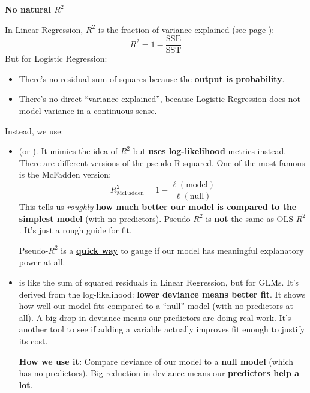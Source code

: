 \highspace
\begin{flushleft}
    \textcolor{Red2}{ \textbf{No natural $R^2$}}
\end{flushleft}
In Linear Regression, $R^2$ is the fraction of variance explained (see page \pageref{eq: coefficient of determination}):
\begin{equation*}
    R^2 = 1 - \frac{\text{SSE}}{\text{SST}}
\end{equation*}
But for Logistic Regression:
\begin{itemize}[label=\textcolor{Red2}{}]
    \item There's no residual sum of squares because the \textbf{output is probability}.
    \item There's no direct ``variance explained'', because Logistic Regression does not model variance in a continuous sense.
\end{itemize}
Instead, we use:
\begin{itemize}
    \item {} (or ). It mimics the idea of $R^{2}$ but \textbf{uses log-likelihood} metrics instead. There are different versions of the pseudo R-squared. One of the most famous is the McFadden version:
    \begin{equation}
        R^2_{\text{McFadden}} = 1 - \dfrac{\ell(\text{model})}{\ell(\text{null})}
    \end{equation}
    This tells us \emph{roughly} \textbf{how much better our model is compared to the simplest model} (with no predictors). Pseudo-$R^2$ is \textbf{not} the same as OLS $R^2$. It's just a rough guide for fit.

    Pseudo-$R^2$ is a \textbf{\underline{quick way}} to gauge if our model has meaningful explanatory power at all.


    \item {} is like the sum of squared residuals in Linear Regression, but for GLMs. It's derived from the log-likelihood: \textbf{lower deviance means better fit}. It shows how well our model fits compared to a ``null'' model (with no predictors at all). A big drop in deviance means our predictors are doing real work. It's another tool to see if adding a variable actually improves fit enough to justify its cost.

    \textcolor{Green3}{ \textbf{How we use it:}} Compare deviance of our model to a \textbf{null model} (which has no predictors). Big reduction in deviance means our \textbf{predictors help a lot}.
\end{itemize}

